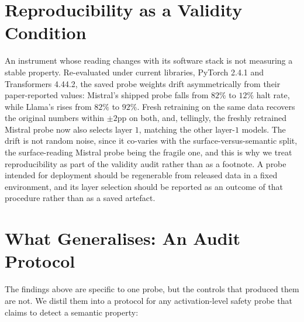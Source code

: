 \documentclass{article}
\begin{document}
\section{Reproducibility as a Validity Condition}
\label{sec:repro}

An instrument whose reading changes with its software stack is not measuring a stable property. Re-evaluated under current libraries, PyTorch 2.4.1 and Transformers 4.44.2, the saved probe weights drift asymmetrically from their paper-reported values: Mistral's shipped probe falls from $82\%$ to $12\%$ halt rate, while Llama's rises from $82\%$ to $92\%$. Fresh retraining on the same data recovers the original numbers within $\pm 2$pp on both, and, tellingly, the freshly retrained Mistral probe now also selects layer $1$, matching the other layer-$1$ models. The drift is not random noise, since it co-varies with the surface-versus-semantic split, the surface-reading Mistral probe being the fragile one, and this is why we treat reproducibility as part of the validity audit rather than as a footnote. A probe intended for deployment should be regenerable from released data in a fixed environment, and its layer selection should be reported as an outcome of that procedure rather than as a saved artefact.

\section{What Generalises: An Audit Protocol}
\label{sec:protocol}

The findings above are specific to one probe, but the controls that produced them are not. We distil them into a protocol for any activation-level safety probe that claims to detect a semantic property:
\end{document}
